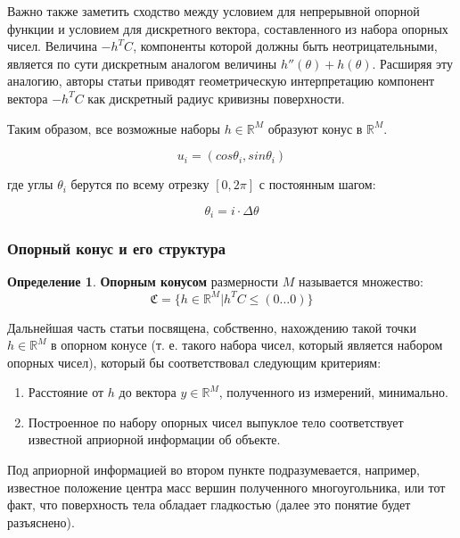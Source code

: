 \documentclass[a4paper, 12pt, titlepage]{article}
\theoremstyle{definition}
\newtheorem{SmartDefinition}{Определение}
\theoremstyle{plain}
\theoremstyle{plain}
\begin{document}
Важно также заметить сходство между условием для непрерывной опорной функции и
условием для дискретного вектора, составленного из набора опорных чисел.
Величина $ - h^{T} C$, компоненты которой должны быть неотрицательными, является
по сути дискретным аналогом величины $h''(\theta) + h(\theta)$. Расширяя эту
аналогию, авторы статьи приводят геометрическую интерпретацию компонент вектора
$ - h^{T} C$ как дискретный радиус кривизны поверхности.

Таким образом, все возможные наборы $h \in \mathbb{R}^{M}$ образуют конус в
$\mathbb{R}^{M}$.

\begin{equation}
 u_{i} = (cos \theta_{i}, sin \theta_{i})
\end{equation}

где углы $\theta_{i}$ берутся по всему отрезку $[0, 2 \pi]$ с постоянным шагом:

\begin{equation}
 \theta_{i} = i \cdot \Delta \theta
\end{equation}

\subsubsection{Опорный конус и его структура}
\label{sec:support-methods:2d-uniform:support-cone}

\begin{SmartDefinition}
 \label{def:support-cone}
 \textbf{Опорным конусом} размерности $M$ называется множество:
 \begin{equation}
 \mathfrak{C} = \{h \in \mathbb{R}^{M} | h^{T} C \leq (0 \ldots 0) \}
 \end{equation}
\end{SmartDefinition}

Дальнейшая часть статьи посвящена, собственно, нахождению такой точки
$h \in \mathbb{R}^{M}$ в
опорном конусе (т. е. такого набора чисел, который является набором опорных
чисел), который бы соответствовал следующим критериям:

\begin{enumerate}
 \item Расстояние от $h$ до вектора $y \in \mathbb{R}^{M}$, полученного из
измерений, минимально.
 \item Построенное по набору опорных чисел выпуклое тело соответствует
известной априорной информации об объекте.
\end{enumerate}

Под априорной информацией во втором пункте подразумевается, например, известное
положение центра масс вершин полученного многоугольника, или тот факт, что
поверхность тела обладает гладкостью (далее это понятие будет разъяснено).
\end{document}
